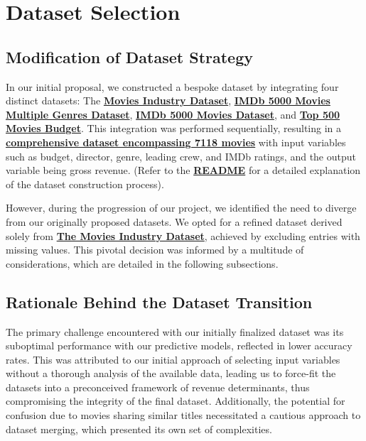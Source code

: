 \documentclass[conference]{IEEEtran}
\begin{document}
\section{Dataset Selection}
     \subsection{Modification of Dataset Strategy}
        In our initial proposal, we constructed a bespoke dataset by integrating four distinct datasets: The \href{https://www.kaggle.com/datasets/danielgrijalvas/movies}{\textbf{Movies Industry Dataset}}, \href{https://www.kaggle.com/datasets/rakkesharv/imdb-5000-movies-multiple-genres-dataset}{\textbf{IMDb 5000 Movies Multiple Genres Dataset}}, \href{https://www.kaggle.com/datasets/carolzhangdc/imdb-5000-movie-dataset}{\textbf{IMDb 5000 Movies Dataset}}, and \href{https://www.kaggle.com/datasets/mitchellharrison/top-500-movies-budget}{\textbf{Top 500 Movies Budget}}. This integration was performed sequentially, resulting in a \href{https://github.com/Vikranth3140/Movie-Revenue-Prediction/blob/main/old%20datasets/final_dataset.csv}{\textbf{comprehensive dataset encompassing 7118 movies}} with input variables such as budget, director, genre, leading crew, and IMDb ratings, and the output variable being gross revenue. (Refer to the \href{https://github.com/Vikranth3140/Movie-Revenue-Prediction/blob/main/old%20datasets/README.md}{\textbf{README}} for a detailed explanation of the dataset construction process).
        
        However, during the progression of our project, we identified the need to diverge from our originally proposed datasets. We opted for a refined dataset derived solely from \href{https://www.kaggle.com/datasets/danielgrijalvas/movies}{\textbf{The Movies Industry Dataset}}, achieved by excluding entries with missing values. This pivotal decision was informed by a multitude of considerations, which are detailed in the following subsections.
    
    \subsection{Rationale Behind the Dataset Transition}
        The primary challenge encountered with our initially finalized dataset was its suboptimal performance with our predictive models, reflected in lower accuracy rates. This was attributed to our initial approach of selecting input variables without a thorough analysis of the available data, leading us to force-fit the datasets into a preconceived framework of revenue determinants, thus compromising the integrity of the final dataset. Additionally, the potential for confusion due to movies sharing similar titles necessitated a cautious approach to dataset merging, which presented its own set of complexities.
        
\end{document}
